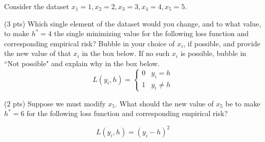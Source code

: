 \documentclass[twoside,12pt]{article}
\newcommand{\nishant}[1]{{\color{orange}[{\bf Nishant}: #1]}}
\newcommand{\suraj}[1]{{\color{blue}[{\bf Suraj}: #1]}}
\begin{document}
\begin{probset}

\begin{prob}
Consider the dataset $x_1 = 1, x_2 = 2, x_3 = 3, x_4 = 4, x_5 = 5$.


\begin{subprobset}
    \begin{subprob} (3 pts)
        Which single element of the dataset would you change, and to what value, to make \( h^* = 4 \) the single minimizing value for the following loss function and corresponding empirical risk? Bubble in your choice of $x_i$, if possible, and provide the new value of that $x_i$ in the box below. If no such $x_i$ is possible, bubble in ``Not possible" and explain why in the box below.
        $$L(y_i, h) = \begin{cases} 0 & y_i = h \\ 1 & y_i \neq h \end{cases}$$

        \begin{center}
        \end{center}
        \begin{responsebox}{0.65in}
            
        \end{responsebox}
    \end{subprob}
    
    \begin{subprob}(2 pts)
        Suppose we must modify $x_5$. What should the new value of $x_5$ be to make \( h^* = 6 \) for the following loss function and corresponding empirical risk?  

        \vspace{-0.3cm}
        $$L(y_i, h) = (y_i - h)^2$$


\end{subprob}
\end{subprobset}
\end{prob}
\end{probset}
\end{document}

